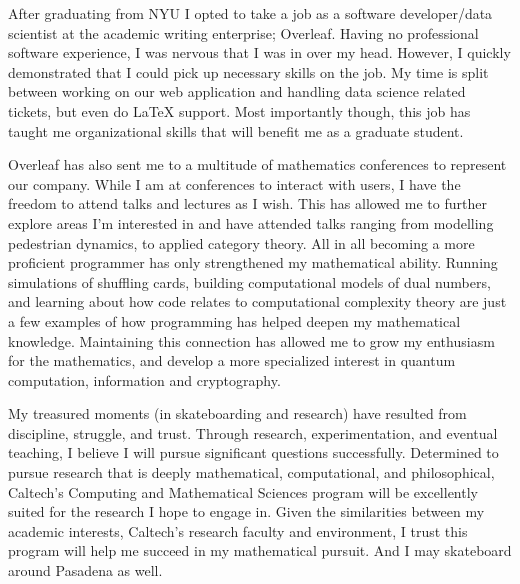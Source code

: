 \documentclass[11pt]{article}
\begin{document}
After graduating from NYU I opted to take a job as a software developer/data scientist at the academic writing enterprise; Overleaf. Having no professional software experience, I was nervous that I was in over my head. However, I quickly demonstrated that I could pick up necessary skills on the job. My time is split between working on our web application and handling data science related tickets, but even do \LaTeX{} support. Most importantly though, this job has taught me organizational skills that will benefit me as a graduate student. 

Overleaf has also sent me to a multitude of mathematics conferences to represent our company. While I am at conferences to interact with users, I have the freedom to attend talks and lectures as I wish. This has allowed me to further explore areas I'm interested in and have attended talks ranging from modelling pedestrian dynamics, to applied category theory. All in all becoming a more proficient programmer has only strengthened my mathematical ability. Running simulations of shuffling cards, building computational models of dual numbers, and learning about how code relates to computational complexity theory are just a few examples of how programming has helped deepen my mathematical knowledge. Maintaining this connection has allowed me to grow my enthusiasm for the mathematics, and develop a more specialized interest in quantum computation, information and cryptography.

My treasured moments (in skateboarding and research) have resulted from discipline, struggle, and trust. Through research, experimentation, and eventual teaching, I believe I will pursue significant questions successfully. Determined to pursue research that is deeply mathematical, computational, and philosophical, Caltech's Computing and Mathematical Sciences program will be excellently suited for the research I hope to engage in. Given the similarities between my academic interests, Caltech’s research faculty and environment, I trust this program will help me succeed in my mathematical pursuit. And I may skateboard around Pasadena as well.
\end{document}

